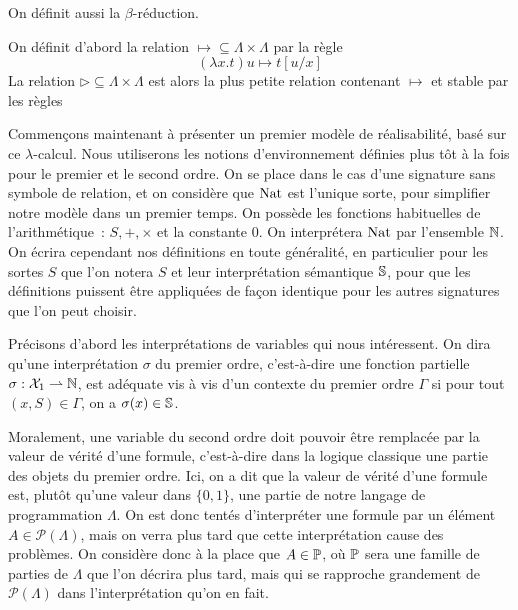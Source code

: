 \documentclass{article}
\begin{document}
On définit aussi la $\beta$-réduction.

\begin{defi}
    On définit d'abord la relation $\mapsto\subseteq \Lambda\times\Lambda$ par la règle
    \[(\lambda x.t)u \mapsto t[u/x]\]
    La relation $\rhd\subseteq \Lambda\times\Lambda$ est alors la plus petite relation contenant $\mapsto$ et stable par les règles
    \begin{center}
        \begin{prooftree}
        \end{prooftree}
        \qquad
        \begin{prooftree}
        \end{prooftree}
        \qquad
        \begin{prooftree}
        \end{prooftree}
    \end{center}
\end{defi}

Commençons maintenant à présenter un premier modèle de réalisabilité, basé sur ce $\lambda$-calcul. Nous utiliserons les notions d'environnement définies plus tôt à la fois pour le premier et le second ordre. On se place dans le cas d'une signature sans symbole de relation, et on considère que $\Nat$ est l'unique sorte, pour simplifier notre modèle dans un premier temps. On possède les fonctions habituelles de l'arithmétique~: $S,+,\times$ et la constante $0$. On interprétera $\Nat$ par l'ensemble $\bN$. On écrira cependant nos définitions en toute généralité, en particulier pour les sortes $S$ que l'on notera $S$ et leur interprétation sémantique $\bS$, pour que les définitions puissent être appliquées de façon identique pour les autres signatures que l'on peut choisir.

Précisons d'abord les interprétations de variables qui nous intéressent. On dira qu'une interprétation $\sigma$ du premier ordre, c'est-à-dire une fonction partielle $\sigma : \mathcal X_1 \rightharpoonup \bN$, est adéquate vis à vis d'un contexte du premier ordre $\Gamma$ si pour tout $(x,S) \in \Gamma$, on a $\sigma(x) \in \bS$.

Moralement, une variable du second ordre doit pouvoir être remplacée par la valeur de vérité d'une formule, c'est-à-dire dans la logique classique une partie des objets du premier ordre. Ici, on a dit que la valeur de vérité d'une formule est, plutôt qu'une valeur dans $\{0,1\}$, une partie de notre langage de programmation $\Lambda$. On est donc tentés d'interpréter une formule par un élément $A \in \mathcal P(\Lambda)$, mais on verra plus tard que cette interprétation cause des problèmes. On considère donc à la place que $A \in \bP$, où $\bP$ sera une famille de parties de $\Lambda$ que l'on décrira plus tard, mais qui se rapproche grandement de $\mathcal P(\Lambda)$ dans l'interprétation qu'on en fait.
\end{document}
